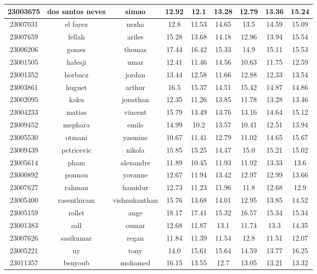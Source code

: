 \documentclass{article}%
\begin{document}
\begin{tabular}{|c|c|c|c|c|c|c|c|c|}
\hline%
23003675&dos santos neves&simao&12.92&12.1&13.28&12.79&13.36&15.24\\%
\hline%
23007031&el fayez&nezha&12.8&11.53&14.65&13.5&14.59&15.09\\%
\hline%
23007659&fellah&ariles&15.28&13.68&14.18&12.96&13.94&15.54\\%
\hline%
23006206&gomes&thomas&17.44&16.42&15.33&14.9&15.11&15.53\\%
\hline%
23001505&hafesji&umar&12.41&11.46&14.56&10.63&11.75&12.59\\%
\hline%
23001352&horbacz&jordan&13.44&12.58&11.66&12.88&12.33&13.54\\%
\hline%
23003861&huguet&arthur&16.5&15.37&14.51&15.42&14.87&14.86\\%
\hline%
23002095&kaku&jonathan&12.35&11.26&13.85&11.78&13.28&13.46\\%
\hline%
23004233&matias&vincent&15.79&13.49&13.76&13.16&14.64&15.12\\%
\hline%
23009452&mephara&emile&14.99&10.2&13.57&10.41&12.51&13.94\\%
\hline%
23005530&otmani&yasmine&10.67&11.41&12.79&11.02&14.65&15.67\\%
\hline%
23009439&petricevic&nikola&15.85&15.25&14.47&15.0&15.21&15.02\\%
\hline%
23005614&pham&alexandre&11.89&10.45&11.93&11.92&13.33&13.6\\%
\hline%
23000892&ponnou&yovanne&12.67&11.94&13.42&12.97&12.99&13.66\\%
\hline%
23007627&rahman&hamidur&12.73&11.23&11.96&11.8&12.68&12.9\\%
\hline%
23005400&rasenthiram&vishnukanthan&15.76&13.68&14.01&12.95&13.85&14.52\\%
\hline%
23005159&rollet&ange&18.17&17.41&15.32&16.57&15.34&15.34\\%
\hline%
23001383&sall&oumar&12.68&11.87&13.1&11.74&13.3&14.35\\%
\hline%
23007626&sasikumar&regan&11.84&11.39&11.54&12.8&11.51&12.07\\%
\hline%
23005221&uy&tony&14.0&15.61&15.64&14.59&13.77&16.25\\%
\hline%
23011357&benyoub&mohamed&16.15&13.55&12.7&13.05&13.21&13.32\\%
\hline%
\end{tabular}

%
\end{document}
